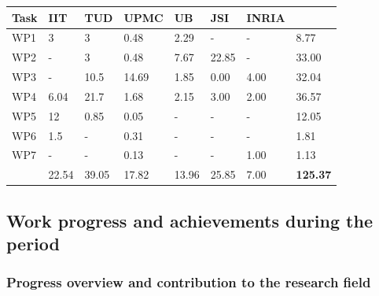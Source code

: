 \documentclass[12pt,a4paper,twoside]{article}
\begin{document}
\begin{longtable}{|C{1.5cm}|C{1.5cm}|C{1.5cm}|C{1.5cm}|C{1.5cm}|C{1.5cm}|C{1.5cm}|C{1.5cm}|}
\footnotesize \textbf{Task}& \footnotesize \textbf{IIT}&\footnotesize \textbf{TUD}&\footnotesize \textbf{UPMC}& \footnotesize \textbf{UB} &\footnotesize \textbf{JSI} &\footnotesize \textbf{INRIA} &  \\ \hline
\footnotesize WP1      &  3        &  3      &  0.48   &  2.29  &  -     &  -     &  8.77 \\  \hline
\footnotesize WP2      &  -        &  3      &  0.48   &  7.67  &  22.85 &  -     &  33.00\\  \hline
\footnotesize WP3      &  -        &  10.5   &  14.69  &  1.85  &  0.00  &  4.00  &  32.04\\  \hline
\footnotesize WP4      &  6.04     &  21.7   &  1.68   &  2.15  &  3.00  &  2.00  &  36.57\\  \hline
\footnotesize WP5      &  12       &  0.85   &  0.05   &  -     &  -     &  -     &  12.05\\  \hline
\footnotesize WP6      &  1.5      &  -      &  0.31   &  -     &  -     &  -     &  1.81 \\  \hline
\footnotesize WP7      &  -        &  -      &  0.13   &  -     &  -     &  1.00  &  1.13 \\  \hline
{}  &  22.54    &  39.05  &  17.82  &  13.96 &  25.85 &  7.00  &  
\textbf{125.37}     \\  
\end{longtable}










\subsection{Work progress and achievements during the period}

\subsubsection{Progress overview and contribution to the research field}
\end{document}
